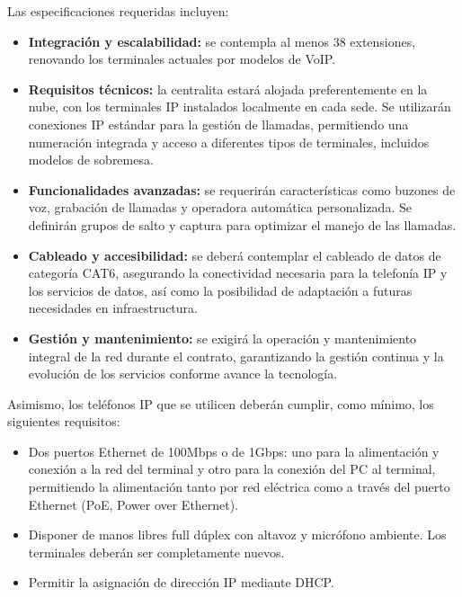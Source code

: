 \vspace{0.5cm}
\noindent
Las especificaciones requeridas incluyen:
\begin{itemize}
	\item \textbf{Integración y escalabilidad:} se contempla al menos 38 extensiones, renovando los terminales actuales por modelos de VoIP.
	\item \textbf{Requisitos técnicos:} la centralita estará alojada preferentemente en la nube, con los terminales IP instalados localmente en cada sede. Se utilizarán conexiones IP estándar para la gestión de llamadas, permitiendo una numeración integrada y acceso a diferentes tipos de terminales, incluidos modelos de sobremesa.
	\item \textbf{Funcionalidades avanzadas:} se requerirán características como buzones de voz, grabación de llamadas y operadora automática personalizada. Se definirán grupos de salto y captura para optimizar el manejo de las llamadas.
	\item \textbf{Cableado y accesibilidad:} se deberá contemplar el cableado de datos de categoría CAT6, asegurando la conectividad necesaria para la telefonía IP y los servicios de datos, así como la posibilidad de adaptación a futuras necesidades en infraestructura.
	\item \textbf{Gestión y mantenimiento:} se exigirá la operación y mantenimiento integral de la red durante el contrato, garantizando la gestión continua y la evolución de los servicios conforme avance la tecnología.
\end{itemize}

\label{sec:requisitos_telefonia_ip}
\vspace{0.3cm}
Asimismo, los teléfonos IP que se utilicen deberán cumplir, como mínimo, los siguientes requisitos:
\begin{itemize}
	\item Dos puertos Ethernet de 100Mbps o de 1Gbps: uno para la alimentación y conexión a la red del terminal y otro para la conexión del PC al terminal, permitiendo la alimentación tanto por red eléctrica como a través del puerto Ethernet (PoE, Power over Ethernet).
	\item Disponer de manos libres full dúplex con altavoz y micrófono ambiente. Los terminales deberán ser completamente nuevos.
	\item Permitir la asignación de dirección IP mediante DHCP.
\end{itemize}